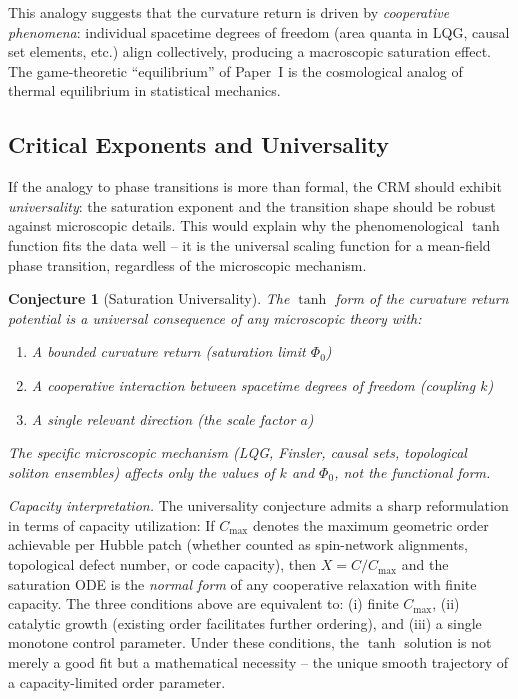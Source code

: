 \documentclass[aps,prd,twocolumn,superscriptaddress,nofootinbib]{revtex4-2}
\newtheorem{conjecture}{Conjecture}
\begin{document}
This analogy suggests that the curvature return is driven by \textit{cooperative phenomena}: individual spacetime degrees of freedom (area quanta in LQG, causal set elements, etc.) align collectively, producing a macroscopic saturation effect. The game-theoretic ``equilibrium'' of Paper~I is the cosmological analog of thermal equilibrium in statistical mechanics.

\subsection{Critical Exponents and Universality}

If the analogy to phase transitions is more than formal, the CRM should exhibit \textit{universality}: the saturation exponent and the transition shape should be robust against microscopic details. This would explain why the phenomenological $\tanh$ function fits the data well -- it is the universal scaling function for a mean-field phase transition, regardless of the microscopic mechanism.

\begin{conjecture}[Saturation Universality]
The $\tanh$ form of the curvature return potential is a \textit{universal} consequence of any microscopic theory with:
\begin{enumerate}
\item A bounded curvature return (saturation limit $\Phi_0$)
\item A cooperative interaction between spacetime degrees of freedom (coupling $k$)
\item A single relevant direction (the scale factor $a$)
\end{enumerate}
The specific microscopic mechanism (LQG, Finsler, causal sets, topological soliton ensembles) affects only the values of $k$ and $\Phi_0$, not the functional form.
\end{conjecture}

\textit{Capacity interpretation.} The universality conjecture admits a sharp reformulation in terms of capacity utilization: If $C_{\max}$ denotes the maximum geometric order achievable per Hubble patch (whether counted as spin-network alignments, topological defect number, or code capacity), then $X = C/C_{\max}$ and the saturation ODE is the \textit{normal form} of any cooperative relaxation with finite capacity. The three conditions above are equivalent to: (i) finite $C_{\max}$, (ii) catalytic growth (existing order facilitates further ordering), and (iii) a single monotone control parameter. Under these conditions, the $\tanh$ solution is not merely a good fit but a mathematical necessity -- the unique smooth trajectory of a capacity-limited order parameter.
\end{document}
